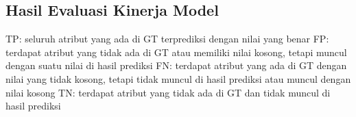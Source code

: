 \subsection{Hasil Evaluasi Kinerja Model}
\label{subsec:hasil-evaluasi-kinerja-model}

TP: seluruh atribut yang ada di GT terprediksi dengan nilai yang benar
FP: terdapat atribut yang tidak ada di GT atau memiliki nilai kosong, tetapi muncul dengan suatu nilai di hasil prediksi
FN: terdapat atribut yang ada di GT dengan nilai yang tidak kosong, tetapi tidak muncul di hasil prediksi atau muncul dengan nilai kosong
TN: terdapat atribut yang tidak ada di GT dan tidak muncul di hasil prediksi
